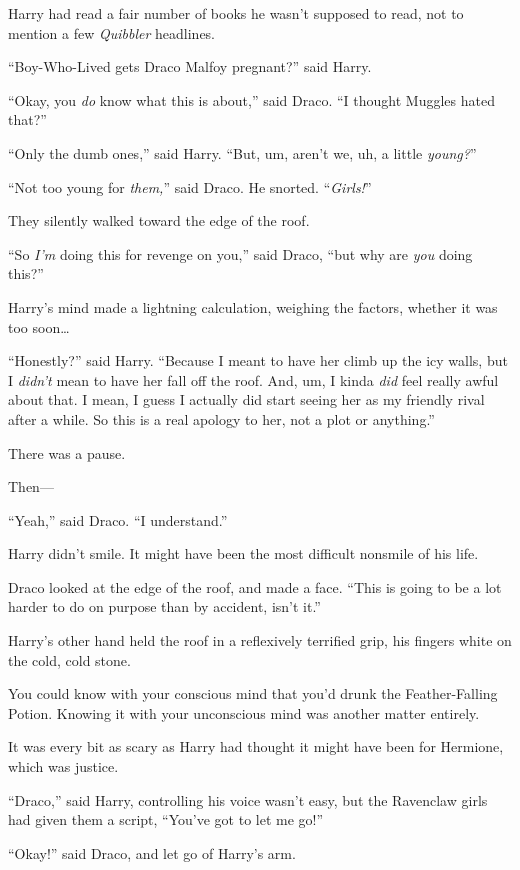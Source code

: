 Harry had read a fair number of books he wasn’t supposed to read, not to
mention a few \emph{Quibbler} headlines.

“Boy-Who-Lived gets Draco Malfoy pregnant?” said Harry.

“Okay, you \emph{do} know what this is about,” said Draco. “I thought Muggles
hated that?”

“Only the dumb ones,” said Harry. “But, um, aren’t we, uh, a little
\emph{young?}”

“Not too young for \emph{them,}” said Draco. He snorted. “\emph{Girls!}”

They silently walked toward the edge of the roof.

“So \emph{I’m} doing this for revenge on you,” said Draco, “but why are
\emph{you} doing this?”

Harry’s mind made a lightning calculation, weighing the factors, whether it was
too soon…

“Honestly?” said Harry. “Because I meant to have her climb up the icy walls,
but I \emph{didn’t} mean to have her fall off the roof. And, um, I kinda
\emph{did} feel really awful about that. I mean, I guess I actually did start
seeing her as my friendly rival after a while. So this is a real apology to
her, not a plot or anything.”

There was a pause.

Then—

“Yeah,” said Draco. “I understand.”

Harry didn’t smile. It might have been the most difficult nonsmile of his life.

Draco looked at the edge of the roof, and made a face. “This is going to be a
lot harder to do on purpose than by accident, isn’t it.”

\later

Harry’s other hand held the roof in a reflexively terrified grip, his fingers
white on the cold, cold stone.

You could know with your conscious mind that you’d drunk the Feather-Falling
Potion. Knowing it with your unconscious mind was another matter entirely.

It was every bit as scary as Harry had thought it might have been for Hermione,
which was justice.

“Draco,” said Harry, controlling his voice wasn’t easy, but the Ravenclaw girls
had given them a script, “You’ve got to let me go!”

“Okay!” said Draco, and let go of Harry’s arm.

